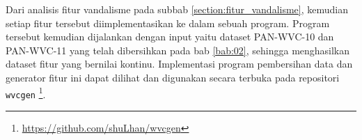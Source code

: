 Dari analisis fitur vandalisme pada subbab \ref{section:fitur_vandalisme},
kemudian setiap fitur tersebut diimplementasikan ke dalam sebuah program.
Program tersebut kemudian dijalankan dengan input yaitu dataset PAN-WVC-10
dan PAN-WVC-11 yang telah dibersihkan pada bab \ref{bab:02},
sehingga menghasilkan dataset fitur yang bernilai kontinu.
Implementasi program pembersihan data dan generator fitur ini dapat dilihat dan
digunakan secara terbuka pada repositori \texttt{wvcgen}
\footnote{\url{https://github.com/shuLhan/wvcgen}}.
